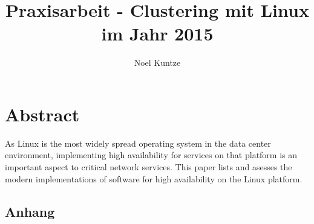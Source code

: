 \documentclass[a4paper]{article}
\begin{document}
\title{Praxisarbeit - Clustering mit Linux im Jahr 2015}
\author{Noel Kuntze }
\maketitle

\newpage
\tableofcontents
\setcounter{tocdepth}{2}

\newpage
\listoffigures

\newpage

\section*{Abstract}
As Linux is the most widely spread operating system in the data center environment,
implementing high availability for services on that platform is an important aspect to
critical network services. This paper lists and asesses the modern implementations
of software for high availability on the Linux platform.

\newpage
















\newpage

\nocite{*}
{}



\newpage

\begin{appendix}

\section{Anhang}
\end{appendix}
\end{document}
